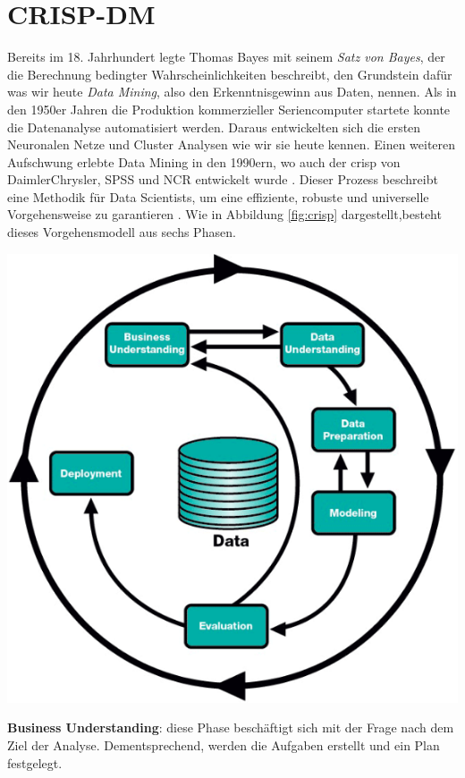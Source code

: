 \documentclass[
    12pt, %
    DIV10,
    ngerman, %
    a4paper, %
    oneside, %
    titlepage, %
    parskip=half, %
    headings=normal, %
    listof=totoc, %
    bibliography=totoc, %
    index=totoc, %
    captions=tableheading, %
    final %
]{scrreprt}
\begin{document}
\section{CRISP-DM}
\label{sec:crisp}
Bereits im 18. Jahrhundert legte Thomas Bayes mit seinem \emph{Satz von Bayes}, der die Berechnung bedingter Wahrscheinlichkeiten beschreibt, den Grundstein dafür was wir heute \emph{Data Mining}, also den Erkenntnisgewinn aus Daten, nennen. Als in den 1950er Jahren die Produktion kommerzieller Seriencomputer startete konnte die Datenanalyse automatisiert werden. Daraus entwickelten sich die ersten Neuronalen Netze und Cluster Analysen wie wir sie heute kennen. Einen weiteren Aufschwung erlebte Data Mining in den 1990ern, wo auch der \ac{crisp} von DaimlerChrysler, SPSS und NCR entwickelt wurde \parencite{SmartVisionEurop}.
Dieser Prozess beschreibt eine Methodik für Data Scientists, um eine effiziente, robuste und universelle Vorgehensweise zu garantieren \parencite{chapman1999crisp}. Wie in Abbildung \ref{fig:crisp} dargestellt,besteht dieses Vorgehensmodell aus sechs Phasen.
\begin{center}
\includegraphics[scale=0.5]{img/crisp.png}
\label{fig:crisp}
\end{center}
\textbf{Business Understanding}: diese Phase beschäftigt sich mit der Frage nach dem Ziel der Analyse. Dementsprechend, werden die Aufgaben erstellt und ein Plan festgelegt.\\
\end{document}
